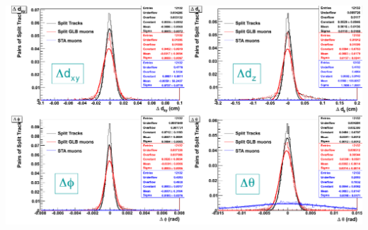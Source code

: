 \documentclass[compress]{beamer}
\begin{document}
\begin{frame}
\begin{columns}
\includegraphics[width=\linewidth]{mismatch1.png}
\end{columns}
\end{frame}
\end{document}
